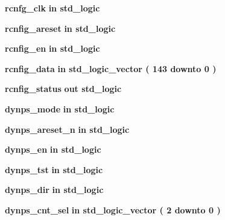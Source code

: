 \begin{DoxyCompactItemize}
\item 
{\bf rcnfg\+\_\+clk}  {\bfseries {\bfseries \textcolor{keywordflow}{in}\textcolor{vhdlchar}{ }}} {\bfseries \textcolor{comment}{std\+\_\+logic}\textcolor{vhdlchar}{ }} 
\item 
{\bf rcnfig\+\_\+areset}  {\bfseries {\bfseries \textcolor{keywordflow}{in}\textcolor{vhdlchar}{ }}} {\bfseries \textcolor{comment}{std\+\_\+logic}\textcolor{vhdlchar}{ }} 
\item 
{\bf rcnfig\+\_\+en}  {\bfseries {\bfseries \textcolor{keywordflow}{in}\textcolor{vhdlchar}{ }}} {\bfseries \textcolor{comment}{std\+\_\+logic}\textcolor{vhdlchar}{ }} 
\item 
{\bf rcnfig\+\_\+data}  {\bfseries {\bfseries \textcolor{keywordflow}{in}\textcolor{vhdlchar}{ }}} {\bfseries \textcolor{comment}{std\+\_\+logic\+\_\+vector}\textcolor{vhdlchar}{ }\textcolor{vhdlchar}{(}\textcolor{vhdlchar}{ }\textcolor{vhdlchar}{ } \textcolor{vhdldigit}{143} \textcolor{vhdlchar}{ }\textcolor{keywordflow}{downto}\textcolor{vhdlchar}{ }\textcolor{vhdlchar}{ } \textcolor{vhdldigit}{0} \textcolor{vhdlchar}{ }\textcolor{vhdlchar}{)}\textcolor{vhdlchar}{ }} 
\item 
{\bf rcnfig\+\_\+status}  {\bfseries {\bfseries \textcolor{keywordflow}{out}\textcolor{vhdlchar}{ }}} {\bfseries \textcolor{comment}{std\+\_\+logic}\textcolor{vhdlchar}{ }} 
\item 
{\bf dynps\+\_\+mode}  {\bfseries {\bfseries \textcolor{keywordflow}{in}\textcolor{vhdlchar}{ }}} {\bfseries \textcolor{comment}{std\+\_\+logic}\textcolor{vhdlchar}{ }} 
\item 
{\bf dynps\+\_\+areset\+\_\+n}  {\bfseries {\bfseries \textcolor{keywordflow}{in}\textcolor{vhdlchar}{ }}} {\bfseries \textcolor{comment}{std\+\_\+logic}\textcolor{vhdlchar}{ }} 
\item 
{\bf dynps\+\_\+en}  {\bfseries {\bfseries \textcolor{keywordflow}{in}\textcolor{vhdlchar}{ }}} {\bfseries \textcolor{comment}{std\+\_\+logic}\textcolor{vhdlchar}{ }} 
\item 
{\bf dynps\+\_\+tst}  {\bfseries {\bfseries \textcolor{keywordflow}{in}\textcolor{vhdlchar}{ }}} {\bfseries \textcolor{comment}{std\+\_\+logic}\textcolor{vhdlchar}{ }} 
\item 
{\bf dynps\+\_\+dir}  {\bfseries {\bfseries \textcolor{keywordflow}{in}\textcolor{vhdlchar}{ }}} {\bfseries \textcolor{comment}{std\+\_\+logic}\textcolor{vhdlchar}{ }} 
\item 
{\bf dynps\+\_\+cnt\+\_\+sel}  {\bfseries {\bfseries \textcolor{keywordflow}{in}\textcolor{vhdlchar}{ }}} {\bfseries \textcolor{comment}{std\+\_\+logic\+\_\+vector}\textcolor{vhdlchar}{ }\textcolor{vhdlchar}{(}\textcolor{vhdlchar}{ }\textcolor{vhdlchar}{ } \textcolor{vhdldigit}{2} \textcolor{vhdlchar}{ }\textcolor{keywordflow}{downto}\textcolor{vhdlchar}{ }\textcolor{vhdlchar}{ } \textcolor{vhdldigit}{0} \textcolor{vhdlchar}{ }\textcolor{vhdlchar}{)}\textcolor{vhdlchar}{ }} 

\end{DoxyCompactItemize}
